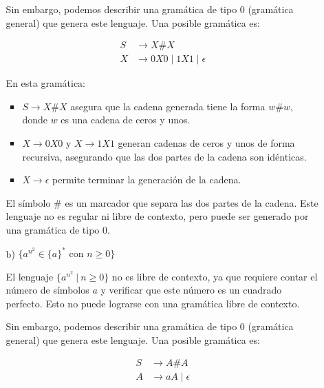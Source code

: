 \documentclass[12pt]{book} %
\begin{document}
\begin{ejercicio}
\begin{itemize}
\begin{itemize}
\begin{solucion}
        Sin embargo, podemos describir una gramática de tipo 0 (gramática general) que genera este lenguaje. Una posible gramática es:

        \begin{align*}
        S &\to X \# X \\
        X &\to 0X0 \mid 1X1 \mid \epsilon
        \end{align*}

        En esta gramática:
        \begin{itemize}
            \item $S \to X \# X$ asegura que la cadena generada tiene la forma $w \# w$, donde $w$ es una cadena de ceros y unos.
            \item $X \to 0X0$ y $X \to 1X1$ generan cadenas de ceros y unos de forma recursiva, asegurando que las dos partes de la cadena son idénticas.
            \item $X \to \epsilon$ permite terminar la generación de la cadena.
        \end{itemize}

        El símbolo $\#$ es un marcador que separa las dos partes de la cadena. Este lenguaje no es regular ni libre de contexto, pero puede ser generado por una gramática de tipo 0.

        \end{solucion}

        

        

        



        \item[b)] $\{a^{n^2} \in \{a\}^* \text{ con } n \geq 0\}$

        \begin{solucion}

        El lenguaje $\{a^{n^2} \ | \ n \geq 0\}$ no es libre de contexto, ya que requiere contar el número de símbolos $a$ y verificar que este número es un cuadrado perfecto. Esto no puede lograrse con una gramática libre de contexto.

        Sin embargo, podemos describir una gramática de tipo 0 (gramática general) que genera este lenguaje. Una posible gramática es:

        \begin{align*}
        S &\to A \# A \\
        A &\to aA \mid \epsilon
        \end{align*}


\end{solucion}
\end{itemize}
\end{itemize}
\end{ejercicio}
\end{document}
